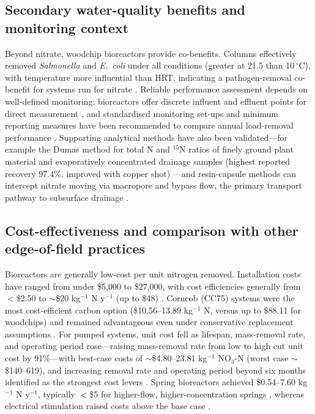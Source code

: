 \documentclass[11pt]{article}
\begin{document}
\subsection{Secondary water-quality benefits and monitoring context}

Beyond nitrate, woodchip bioreactors provide co-benefits. Columns effectively removed \textit{Salmonella} and \textit{E.\ coli} under all conditions (greater at 21.5 than 10\,$^{\circ}$C), with temperature more influential than HRT, indicating a pathogen-removal co-benefit for systems run for nitrate \parencite{Soupir2018}. Reliable performance assessment depends on well-defined monitoring: bioreactors offer discrete influent and effluent points for direct measurement \parencite{Easton2019}, and standardised monitoring set-ups and minimum reporting measures have been recommended to compare annual load-removal performance \parencite{Christianson2021}. Supporting analytical methods have also been validated---for example the Dumas method for total N and $^{15}$N ratios of finely ground plant material and evaporatively concentrated drainage samples (highest reported recovery 97.4\%, improved with copper shot) \parencite{Schindler1999}---and resin-capsule methods can intercept nitrate moving via macropore and bypass flow, the primary transport pathway to subsurface drainage \parencite{Pampolino2000}.

\subsection{Cost-effectiveness and comparison with other edge-of-field practices}

Bioreactors are generally low-cost per unit nitrogen removed. Installation costs have ranged from under \$5,000 to \$27,000, with cost efficiencies generally from $<$\$2.50 to $\sim$\$20 kg$^{-1}$ N y$^{-1}$ (up to \$48) \parencite{Christianson2021}. Corncob (CC75) systems were the most cost-efficient carbon option (\$10.56--13.89 kg$^{-1}$ N, versus up to \$88.11 for woodchips) and remained advantageous even under conservative replacement assumptions \parencite{Law2023}. For pumped systems, unit cost fell as lifespan, mass-removal rate, and operating period rose---raising mass-removal rate from low to high cut unit cost by 91\%---with best-case costs of $\sim$\$4.80--23.81 kg$^{-1}$ NO$_3$-N (worst case $\sim$\$140--619), and increasing removal rate and operating period beyond six months identified as the strongest cost levers \parencite{Hartfiel2024}. Spring bioreactors achieved \$0.54--7.60 kg$^{-1}$ N y$^{-1}$, typically $<$\$5 for higher-flow, higher-concentration springs \parencite{Easton2019}, whereas electrical stimulation raised costs above the base case \parencite{Law2018}.
\end{document}
